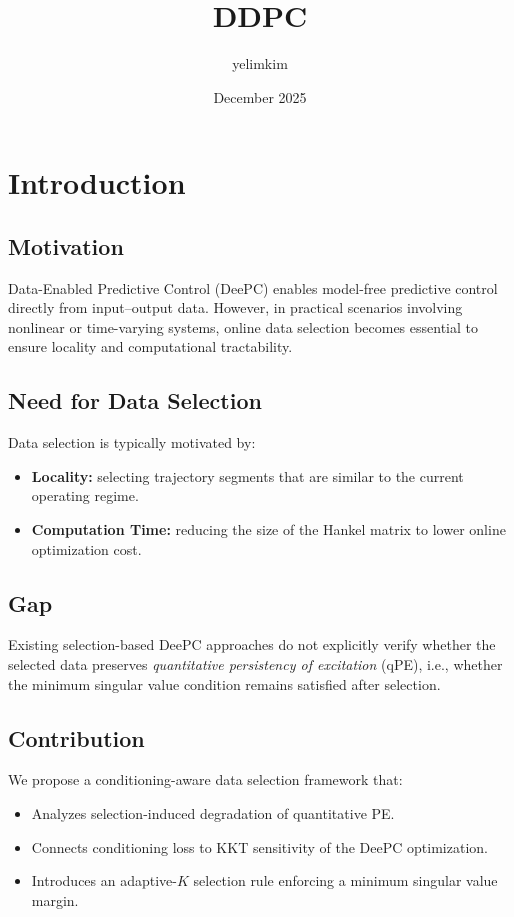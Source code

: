 \documentclass{article}
\title{DDPC}
\author{yelimkim}
\date{December 2025}
\theoremstyle{definition}
\begin{document}
\maketitle

\section{Introduction}

\subsection*{Motivation}
Data-Enabled Predictive Control (DeePC) enables model-free predictive control directly from input--output data. 
However, in practical scenarios involving nonlinear or time-varying systems, 
online data selection becomes essential to ensure locality and computational tractability.

\subsection*{Need for Data Selection}
Data selection is typically motivated by:
\begin{itemize}
    \item \textbf{Locality:} selecting trajectory segments that are similar to the current operating regime.
    \item \textbf{Computation Time:} reducing the size of the Hankel matrix to lower online optimization cost.
\end{itemize}

\subsection*{Gap}
Existing selection-based DeePC approaches do not explicitly verify whether the selected data preserves 
\emph{quantitative persistency of excitation} (qPE), i.e., whether the minimum singular value condition remains satisfied after selection.

\subsection*{Contribution}
We propose a conditioning-aware data selection framework that:
\begin{itemize}
    \item Analyzes selection-induced degradation of quantitative PE.
    \item Connects conditioning loss to KKT sensitivity of the DeePC optimization.
    \item Introduces an adaptive-$K$ selection rule enforcing a minimum singular value margin.
\end{itemize}
\end{document}
